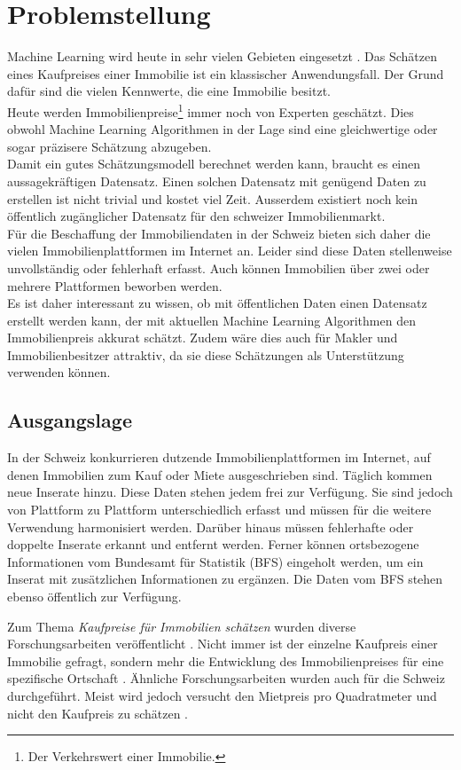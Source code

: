 \section{Problemstellung}
Machine Learning wird heute in sehr vielen Gebieten eingesetzt \cite{forbes}. Das Schätzen eines Kaufpreises einer Immobilie ist ein klassischer Anwendungsfall. Der Grund dafür sind die vielen Kennwerte, die eine Immobilie besitzt.\\
Heute werden Immobilienpreise\footnote{Der Verkehrswert einer Immobilie.} immer noch von Experten geschätzt. Dies obwohl Machine Learning Algorithmen in der Lage sind eine gleichwertige oder sogar präzisere  Schätzung abzugeben.\\
Damit ein gutes Schätzungsmodell berechnet werden kann, braucht es einen aussagekräftigen Datensatz. Einen solchen Datensatz mit genügend Daten zu erstellen ist nicht trivial und kostet viel Zeit. Ausserdem existiert noch kein öffentlich zugänglicher Datensatz für den schweizer Immobilienmarkt.\\
Für die Beschaffung der Immobiliendaten in der Schweiz bieten sich daher die vielen Immobilienplattformen im Internet an. Leider sind diese Daten stellenweise unvollständig oder fehlerhaft erfasst. Auch können Immobilien über zwei oder mehrere Plattformen beworben werden.\\
Es ist daher interessant zu wissen, ob mit öffentlichen Daten einen Datensatz erstellt werden kann, der mit aktuellen Machine Learning Algorithmen den Immobilienpreis akkurat schätzt. Zudem wäre dies auch für Makler und Immobilienbesitzer attraktiv, da sie diese Schätzungen als Unterstützung verwenden können.
%
\subsection{Ausgangslage}
In der Schweiz konkurrieren dutzende Immobilienplattformen im Internet, auf denen Immobilien zum Kauf oder Miete ausgeschrieben sind. Täglich kommen neue Inserate hinzu. Diese Daten stehen jedem frei zur Verfügung. Sie sind jedoch von Plattform zu Plattform unterschiedlich erfasst und müssen für die weitere Verwendung harmonisiert werden. Darüber hinaus müssen fehlerhafte oder doppelte Inserate erkannt und entfernt werden. Ferner können ortsbezogene Informationen vom Bundesamt für Statistik (BFS) eingeholt werden, um ein Inserat mit zusätzlichen Informationen zu ergänzen. Die Daten vom BFS stehen ebenso öffentlich zur Verfügung.

Zum Thema \textit{Kaufpreise für Immobilien schätzen} wurden diverse Forschungsarbeiten veröffentlicht \cite{existing_work_1, existing_work_2, existing_work_4}.
Nicht immer ist der einzelne Kaufpreis einer Immobilie gefragt, sondern mehr die Entwicklung des Immobilienpreises für eine spezifische Ortschaft \cite{existing_work_5}. Ähnliche Forschungsarbeiten wurden auch für die Schweiz durchgeführt. Meist wird jedoch versucht den Mietpreis pro Quadratmeter und nicht den Kaufpreis zu schätzen \cite{existing_work_3, existing_work_6}.
%
